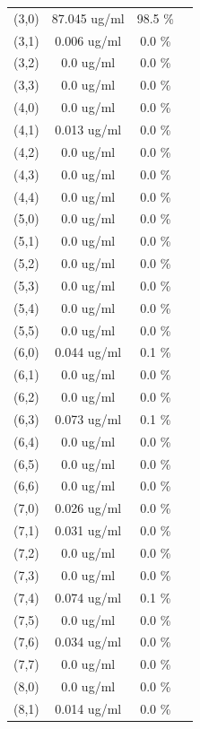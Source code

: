 \documentclass{article}
\begin{document}
\begin{tabular}{c c c c}
(3,0)&        87.045 ug/ml        &98.5 \%\\
(3,1)&        0.006 ug/ml        &0.0 \%\\
(3,2)&        0.0 ug/ml        &0.0 \%\\
(3,3)&        0.0 ug/ml        &0.0 \%\\
(4,0)&        0.0 ug/ml        &0.0 \%\\
(4,1)&        0.013 ug/ml        &0.0 \%\\
(4,2)&        0.0 ug/ml        &0.0 \%\\
(4,3)&        0.0 ug/ml        &0.0 \%\\
(4,4)&        0.0 ug/ml        &0.0 \%\\
(5,0)&        0.0 ug/ml        &0.0 \%\\
(5,1)&        0.0 ug/ml        &0.0 \%\\
(5,2)&        0.0 ug/ml        &0.0 \%\\
(5,3)&        0.0 ug/ml        &0.0 \%\\
(5,4)&        0.0 ug/ml        &0.0 \%\\
(5,5)&        0.0 ug/ml        &0.0 \%\\
(6,0)&        0.044 ug/ml        &0.1 \%\\
(6,1)&        0.0 ug/ml        &0.0 \%\\
(6,2)&        0.0 ug/ml        &0.0 \%\\
(6,3)&        0.073 ug/ml        &0.1 \%\\
(6,4)&        0.0 ug/ml        &0.0 \%\\
(6,5)&        0.0 ug/ml        &0.0 \%\\
(6,6)&        0.0 ug/ml        &0.0 \%\\
(7,0)&        0.026 ug/ml        &0.0 \%\\
(7,1)&        0.031 ug/ml        &0.0 \%\\
(7,2)&        0.0 ug/ml        &0.0 \%\\
(7,3)&        0.0 ug/ml        &0.0 \%\\
(7,4)&        0.074 ug/ml        &0.1 \%\\
(7,5)&        0.0 ug/ml        &0.0 \%\\
(7,6)&        0.034 ug/ml        &0.0 \%\\
(7,7)&        0.0 ug/ml        &0.0 \%\\
(8,0)&        0.0 ug/ml        &0.0 \%\\
(8,1)&        0.014 ug/ml        &0.0 \%\\

\end{tabular}
\end{document}
